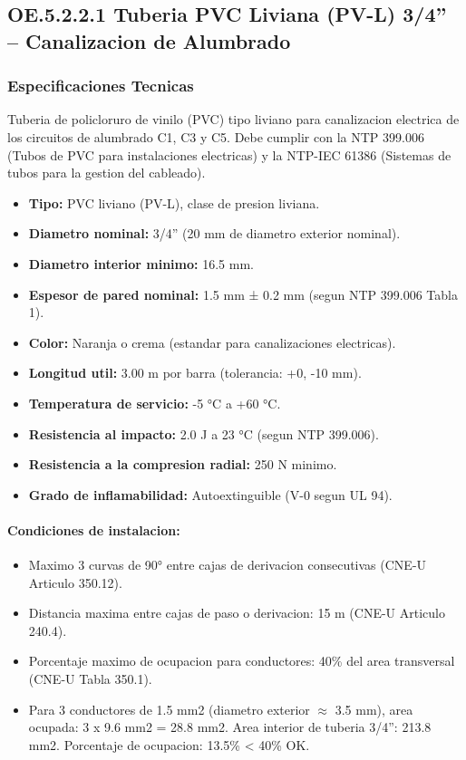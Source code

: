\subsection{OE.5.2.2.1 Tuberia PVC Liviana (PV-L) 3/4'' -- Canalizacion de Alumbrado}

\subsubsection{Especificaciones Tecnicas}

Tuberia de policloruro de vinilo (PVC) tipo liviano para canalizacion electrica de los circuitos de alumbrado C1, C3 y C5. Debe cumplir con la NTP 399.006 (Tubos de PVC para instalaciones electricas) y la NTP-IEC 61386 (Sistemas de tubos para la gestion del cableado).

\begin{itemize}[nosep]
  \item \textbf{Tipo:} PVC liviano (PV-L), clase de presion liviana.
  \item \textbf{Diametro nominal:} 3/4'' (20 mm de diametro exterior nominal).
  \item \textbf{Diametro interior minimo:} 16.5 mm.
  \item \textbf{Espesor de pared nominal:} 1.5 mm ± 0.2 mm (segun NTP 399.006 Tabla 1).
  \item \textbf{Color:} Naranja o crema (estandar para canalizaciones electricas).
  \item \textbf{Longitud util:} 3.00 m por barra (tolerancia: +0, -10 mm).
  \item \textbf{Temperatura de servicio:} -5 °C a +60 °C.
  \item \textbf{Resistencia al impacto:} 2.0 J a 23 °C (segun NTP 399.006).
  \item \textbf{Resistencia a la compresion radial:} 250 N minimo.
  \item \textbf{Grado de inflamabilidad:} Autoextinguible (V-0 segun UL 94).
\end{itemize}

\paragraph{Condiciones de instalacion:}
\begin{itemize}[nosep]
  \item Maximo 3 curvas de 90° entre cajas de derivacion consecutivas (CNE-U Articulo 350.12).
  \item Distancia maxima entre cajas de paso o derivacion: 15 m (CNE-U Articulo 240.4).
  \item Porcentaje maximo de ocupacion para conductores: 40\% del area transversal (CNE-U Tabla 350.1).
  \item Para 3 conductores de 1.5 mm2 (diametro exterior $\approx$ 3.5 mm), area ocupada: 3 x 9.6 mm2 = 28.8 mm2. Area interior de tuberia 3/4'': 213.8 mm2. Porcentaje de ocupacion: 13.5\% < 40\% OK.
\end{itemize}

